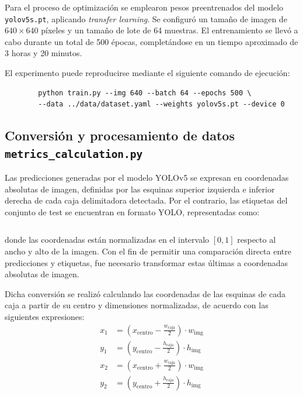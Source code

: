 \documentclass{article}
\begin{document}
	Para el proceso de optimización se emplearon pesos preentrenados del modelo \texttt{yolov5s.pt}, aplicando \textit{transfer learning}. Se configuró un tamaño de imagen de $640 \times 640$ píxeles y un tamaño de lote de 64 muestras. El entrenamiento se llevó a cabo durante un total de 500 épocas, completándose en un tiempo aproximado de 3 horas y 20 minutos.
	
	El experimento puede reproducirse mediante el siguiente comando de ejecución:
	
	\begin{verbatim}
		python train.py --img 640 --batch 64 --epochs 500 \
		--data ../data/dataset.yaml --weights yolov5s.pt --device 0
	\end{verbatim}
	
	\subsection{Conversión y procesamiento de datos \texttt{metrics\_calculation.py}}
	
	Las predicciones generadas por el modelo YOLOv5 se expresan en coordenadas absolutas de imagen, definidas por las esquinas superior izquierda e inferior derecha de cada caja delimitadora detectada. Por el contrario, las etiquetas del conjunto de test se encuentran en formato YOLO, representadas como:
	
	\begin{equation}
		[\text{clase}, x_{\text{centro}}, y_{\text{centro}}, w_{\text{caja}}, h_{\text{caja}}]
	\end{equation}
	
	donde las coordenadas están normalizadas en el intervalo $[0,1]$ respecto al ancho y alto de la imagen. Con el fin de permitir una comparación directa entre predicciones y etiquetas, fue necesario transformar estas últimas a coordenadas absolutas de imagen.
	
	Dicha conversión se realizó calculando las coordenadas de las esquinas de cada caja a partir de su centro y dimensiones normalizadas, de acuerdo con las siguientes expresiones:
	\newpage
	\begin{align}
		x_1 &= \left(x_{\text{centro}} - \frac{w_{\text{caja}}}{2}\right) \cdot w_{\text{img}} \\
		y_1 &= \left(y_{\text{centro}} - \frac{h_{\text{caja}}}{2}\right) \cdot h_{\text{img}} \\
		x_2 &= \left(x_{\text{centro}} + \frac{w_{\text{caja}}}{2}\right) \cdot w_{\text{img}} \\
		y_2 &= \left(y_{\text{centro}} + \frac{h_{\text{caja}}}{2}\right) \cdot h_{\text{img}}
	\end{align}
	
\end{document}
